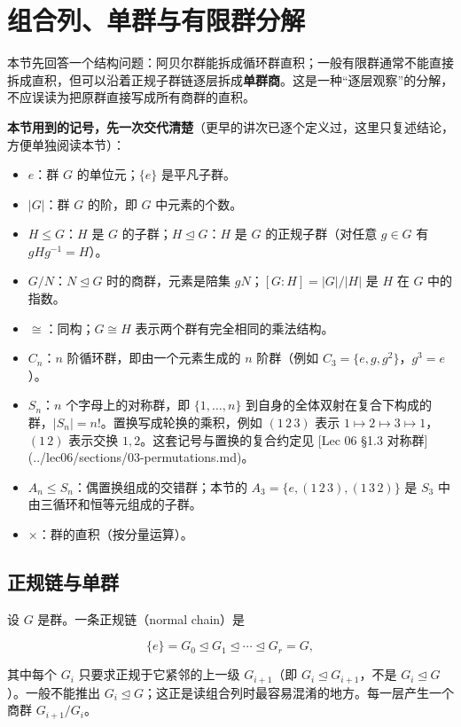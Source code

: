 \section{组合列、单群与有限群分解}


本节先回答一个结构问题：阿贝尔群能拆成循环群直积；一般有限群通常不能直接拆成直积，但可以沿着正规子群链逐层拆成\textbf{单群商}。这是一种“逐层观察”的分解，不应误读为把原群直接写成所有商群的直积。

\textbf{本节用到的记号，先一次交代清楚}（更早的讲次已逐个定义过，这里只复述结论，方便单独阅读本节）：

\begin{itemize}
\item $e$：群 $G$ 的单位元；$\{e\}$ 是平凡子群。
\item $|G|$：群 $G$ 的阶，即 $G$ 中元素的个数。
\item $H\le G$：$H$ 是 $G$ 的子群；$H\trianglelefteq G$：$H$ 是 $G$ 的正规子群（对任意 $g\in G$ 有 $gHg^{-1}=H$）。
\item $G/N$：$N\trianglelefteq G$ 时的商群，元素是陪集 $gN$；$[G:H]=|G|/|H|$ 是 $H$ 在 $G$ 中的指数。
\item $\cong$：同构；$G\cong H$ 表示两个群有完全相同的乘法结构。
\item $C_n$：$n$ 阶循环群，即由一个元素生成的 $n$ 阶群（例如 $C_3=\{e,g,g^2\}$，$g^3=e$）。
\item $S_n$：$n$ 个字母上的对称群，即 $\{1,\dots,n\}$ 到自身的全体双射在复合下构成的群，$|S_n|=n!$。置换写成轮换的乘积，例如 $(1\,2\,3)$ 表示 $1\mapsto2\mapsto3\mapsto1$，$(1\,2)$ 表示交换 $1,2$。这套记号与置换的复合约定见 [Lec 06 §1.3 对称群](../lec06/sections/03-permutations.md)。
\item $A_n\le S_n$：偶置换组成的交错群；本节的 $A_3=\{e,(1\,2\,3),(1\,3\,2)\}$ 是 $S_3$ 中由三循环和恒等元组成的子群。
\item $\times$：群的直积（按分量运算）。
\end{itemize}


\subsection{正规链与单群}


设 $G$ 是群。一条正规链（normal chain）是

\[
\{e\}=G_0\trianglelefteq G_1\trianglelefteq\cdots\trianglelefteq G_r=G,
\]

其中每个 $G_i$ 只要求正规于它紧邻的上一级 $G_{i+1}$（即 $G_i\trianglelefteq G_{i+1}$，不是 $G_i\trianglelefteq G$）。一般不能推出 $G_i\trianglelefteq G$；这正是读组合列时最容易混淆的地方。每一层产生一个商群 $G_{i+1}/G_i$。

